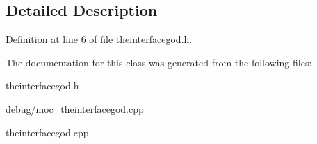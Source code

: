 \subsection{Detailed Description}


Definition at line 6 of file theinterfacegod.\+h.



The documentation for this class was generated from the following files\+:\begin{DoxyCompactItemize}
\item 
theinterfacegod.\+h\item 
debug/moc\+\_\+theinterfacegod.\+cpp\item 
theinterfacegod.\+cpp\end{DoxyCompactItemize}

